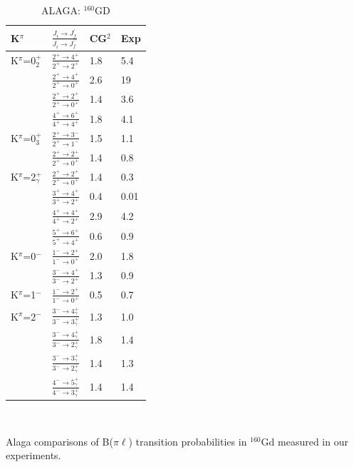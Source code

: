 \begin{table}[h!]
\begin{center}
\caption{ALAGA: $^{160}$GD \label{tab:160Gd_ALAGA}}

\begin{tabular}{llll}
K$^\pi$ & $\frac{J_i\rightarrow J_f^\prime}{J_i\rightarrow J_f^{\prime\prime}}$ & CG$^2$ & Exp \\ \hline \hline
K$^\pi$=0$^+_2$ & $\frac{2^+\rightarrow4^+}{2^+\rightarrow2^+}$ & 1.8 & 5.4 \\
                & $\frac{2^+\rightarrow4^+}{2^+\rightarrow0^+}$ & 2.6 & 19  \\
                & $\frac{2^+\rightarrow2^+}{2^+\rightarrow0^+}$ & 1.4 & 3.6 \\
                & $\frac{4^+\rightarrow6^+}{4^+\rightarrow4^+}$ & 1.8 & 4.1 \\ \hline
K$^\pi$=0$^+_3$ & $\frac{2^+\rightarrow3^-}{2^+\rightarrow1^-}$ & 1.5 & 1.1 \\
                & $\frac{2^+\rightarrow2^+}{2^+\rightarrow0^+}$ & 1.4 & 0.8 \\ \hline
K$^\pi$=2$^+_\gamma$ & $\frac{2^+\rightarrow2^+}{2^+\rightarrow0^+}$ & 1.4 & 0.3 \\ 
                     & $\frac{3^+\rightarrow4^+}{3^+\rightarrow2^+}$ & 0.4 & 0.01 \\
                     & $\frac{4^+\rightarrow4^+}{4^+\rightarrow2^+}$ & 2.9 & 4.2 \\
                     & $\frac{5^+\rightarrow6^+}{5^+\rightarrow4^+}$ & 0.6 & 0.9 \\ \hline
K$^\pi$=0$^-$ & $\frac{1^-\rightarrow2^+}{1^-\rightarrow0^+}$ & 2.0 & 1.8 \\
              & $\frac{3^-\rightarrow4^+}{3^-\rightarrow2^+}$ & 1.3 & 0.9 \\ \hline
K$^\pi$=1$^-$ & $\frac{1^-\rightarrow2^+}{1^-\rightarrow0^+}$ & 0.5 & 0.7 \\ \hline
K$^\pi$=2$^-$ & $\frac{3^-\rightarrow4^+_\gamma}{3^-\rightarrow3^+_\gamma}$ & 1.3 & 1.0 \\
              & $\frac{3^-\rightarrow4^+_\gamma}{3^-\rightarrow2^+_\gamma}$ & 1.8 & 1.4  \\
              & $\frac{3^-\rightarrow3^+_\gamma}{3^-\rightarrow2^+_\gamma}$ & 1.4 & 1.3 \\
              & $\frac{4^-\rightarrow5^+_\gamma}{4^-\rightarrow3^+_\gamma}$ & 1.4 & 1.4 \\
\end{tabular}\\
\end{center}
Alaga comparisons of B($\pi\ell$) transition probabilities in $^{160}$Gd measured in our experiments.
\end{table}

